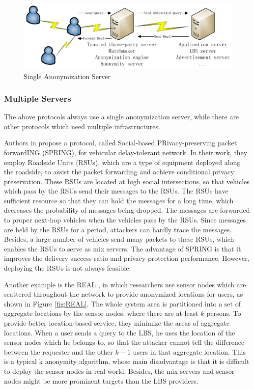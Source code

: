\begin{figure} [H]
  \centering 
  \includegraphics[width=5.0in]{figures/Fig_Single_Ano_Ser.png}
  \caption{Single Anonymization Server} 
  \label{fig:SingleAnoymizationServer} %
\end{figure}

\subsubsection{ Multiple Servers}

\noindent The above protocols always use a single anonymization server, while there are other protocols which need multiple infrastructures. 

Authors in \cite{C25} propose a protocol, called Social-based PRivacy-preserving packet forwardING (SPRING), for vehicular delay-tolerant network. In their work, they employ Roadside Units (RSUs), which are a type of equipment deployed along the roadside, to assist the packet forwarding and achieve conditional privacy preservation. These RSUs are located at high social intersections, so that vehicles which pass by the RSUs send their messages to the RSUs. The RSUs have sufficient resource so that they can hold the messages for a long time, which decreases the probability of messages being dropped. The messages are forwarded to proper next-hop vehicles when the vehicles pass by the RSUs. Since messages are held by the RSUs for a period, attackers can hardly trace the messages. Besides, a large number of vehicles send many packets to these RSUs, which enables the RSUs to serve as mix servers. The advantage of SPRING is that it improves the delivery success ratio and privacy-protection performance. However, deploying the RSUs is not always feasible.

Another example is the REAL \cite{C26}, in which researchers use sensor nodes which are scattered throughout the network to provide anonymized locations for users, as shown in Figure \ref{fig:REAL}. The whole system area is partitioned into a set of aggregate locations by the sensor nodes, where there are at least $k$ persons. To provide better location-based service, they minimize the areas of aggregate locations. When a user sends a query to the LBS, he uses the location of the sensor nodes which he belongs to, so that the attacker cannot tell the difference between the requester and the other $k-1$ users in that aggregate location. This is a typical k anonymity algorithm, whose main disadvantage is that it is difficult to deploy the sensor nodes in real-world. Besides, the mix servers and sensor nodes might be more prominent targets than the LBS providers.

